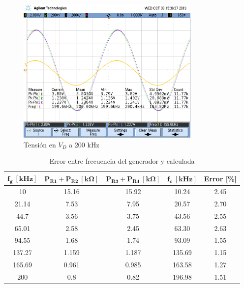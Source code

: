 \begin{figure}[H]
\centering
\includegraphics[width=0.8\textwidth,trim={0 3.45cm 0.1cm 1.75cm},clip]{Mediciones/Tensiones_200_KHz}
\caption{Tensión en $V_D$ a 200 kHz}
\label{fig:Tensiones_200_KHz}
\end{figure}

\begin{table}[H]
\centering
\begin{tabular}{ccccc}
\hline
$\mathbf{f_g \ [kHz]}$ & $\mathbf{P_{R1} + P_{R2} \ [k\Omega]}$ & $\mathbf{P_{R3} + P_{R4} \ [k\Omega]}$ & $\mathbf{f_c \ [kHz]}$ & \textbf{Error [\%]} \\
\hline
10                     & 15.16                                  & 15.92                                  & 10.24                  & 2.45                \\
21.14                  & 7.53                                   & 7.95                                   & 20.57                  & 2.70                \\
44.7                   & 3.56                                   & 3.75                                   & 43.56                  & 2.55                \\
65.01                  & 2.58                                   & 2.45                                   & 63.30                  & 2.63                \\
94.55                  & 1.68                                   & 1.74                                   & 93.09                  & 1.55                \\
137.27                 & 1.159                                  & 1.187                                  & 135.69                 & 1.15                \\
165.69                 & 0.961                                  & 0.985                                  & 163.58                 & 1.27                \\
200                    & 0.8                                    & 0.82                                   & 196.98                 & 1.51   				\\
\hline            
\end{tabular}
\caption{Error entre frecuencia del generador y calculada}
\label{tab:Tabla_error}
\end{table}

